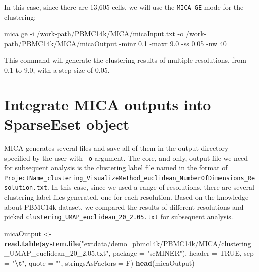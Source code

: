 \documentclass[
  12pt,
]{book}
\newenvironment{Shaded}{\begin{snugshade}}{\end{snugshade}}
\newcommand{\AttributeTok}[1]{\textcolor[rgb]{0.13,0.29,0.53}{#1}}
\newcommand{\ConstantTok}[1]{\textcolor[rgb]{0.56,0.35,0.01}{#1}}
\newcommand{\ExtensionTok}[1]{#1}
\newcommand{\FunctionTok}[1]{\textcolor[rgb]{0.13,0.29,0.53}{\textbf{#1}}}
\newcommand{\NormalTok}[1]{#1}
\newcommand{\OtherTok}[1]{\textcolor[rgb]{0.56,0.35,0.01}{#1}}
\newcommand{\SpecialCharTok}[1]{\textcolor[rgb]{0.81,0.36,0.00}{\textbf{#1}}}
\newcommand{\StringTok}[1]{\textcolor[rgb]{0.31,0.60,0.02}{#1}}
\begin{document}
In this case, since there are 13,605 cells, we will use the \texttt{MICA\ GE} mode for the clustering:

\begin{Shaded}
\begin{Highlighting}[]
\ExtensionTok{mica}\NormalTok{ ge }\AttributeTok{{-}i}\NormalTok{ /work{-}path/PBMC14k/MICA/micaInput.txt }\AttributeTok{{-}o}\NormalTok{ /work{-}path/PBMC14k/MICA/micaOutput }\AttributeTok{{-}minr}\NormalTok{ 0.1 }\AttributeTok{{-}maxr}\NormalTok{ 9.0 }\AttributeTok{{-}ss}\NormalTok{ 0.05 }\AttributeTok{{-}nw}\NormalTok{ 40}
\end{Highlighting}
\end{Shaded}

This command will generate the clustering results of multiple resolutions, from 0.1 to 9.0, with a step size of 0.05.

\section{Integrate MICA outputs into SparseEset object}\label{integrate-mica-outputs-into-sparseeset-object}

MICA generates several files and save all of them in the output directory specified by the user with \texttt{-o} argument. The core, and only, output file we need for subsequent analysis is the clustering label file named in the format of \texttt{ProjectName\_clustering\_VisualizeMethod\_euclidean\_NumberOfDimensions\_Resolution.txt}. In this case, since we used a range of resolutions, there are several clustering label files generated, one for each resolution. Based on the knowledge about PBMC14k dataset, we compared the results of different resolutions and picked \texttt{clustering\_UMAP\_euclidean\_20\_2.05.txt} for subsequent analysis.

\begin{Shaded}
\begin{Highlighting}[]
\NormalTok{micaOutput }\OtherTok{\textless{}{-}} \FunctionTok{read.table}\NormalTok{(}\FunctionTok{system.file}\NormalTok{(}\StringTok{"extdata/demo\_pbmc14k/PBMC14k/MICA/clustering\_UMAP\_euclidean\_20\_2.05.txt"}\NormalTok{, }\AttributeTok{package =} \StringTok{"scMINER"}\NormalTok{), }\AttributeTok{header =} \ConstantTok{TRUE}\NormalTok{, }\AttributeTok{sep =} \StringTok{"}\SpecialCharTok{\textbackslash{}t}\StringTok{"}\NormalTok{, }\AttributeTok{quote =} \StringTok{""}\NormalTok{, }\AttributeTok{stringsAsFactors =}\NormalTok{ F)}
\FunctionTok{head}\NormalTok{(micaOutput)}
\end{Highlighting}
\end{Shaded}
\end{document}
